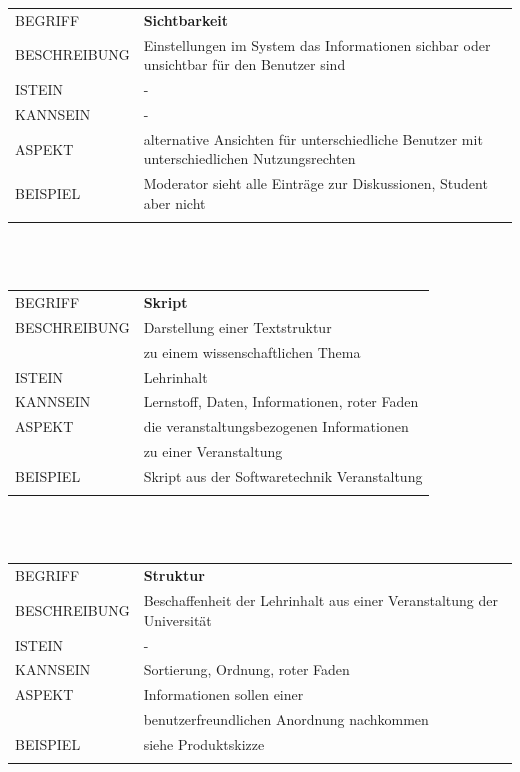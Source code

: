 \documentclass[12pt,a4paper]{article}
\begin{document}
\begin{tabular}{l p{12cm}}
BEGRIFF 	 & \textbf{Sichtbarkeit} \\ 
BESCHREIBUNG & Einstellungen im System das Informationen sichbar oder unsichtbar für den Benutzer sind\\ 
ISTEIN   	 & -\\
KANNSEIN 	 & -\\ 
ASPEKT   	 & alternative Ansichten für unterschiedliche Benutzer mit unterschiedlichen Nutzungsrechten \\
BEISPIEL 	 & Moderator sieht alle Einträge zur Diskussionen, Student aber nicht\\\\
\hline
\end{tabular}\\\\  


\begin{tabular}{l p{12cm}}
BEGRIFF 	 & \textbf{Skript} \\ 
BESCHREIBUNG & Darstellung einer Textstruktur\\
			 & zu einem wissenschaftlichen Thema\\ 
ISTEIN   	 & Lehrinhalt\\
KANNSEIN 	 & Lernstoff, Daten, Informationen, roter Faden\\ 
ASPEKT   	 & die veranstaltungsbezogenen Informationen\\
			 & zu einer Veranstaltung\\
BEISPIEL 	 & Skript aus der Softwaretechnik Veranstaltung\\\\
\hline
\end{tabular}\\\\  

\begin{tabular}{l p{12cm}}
BEGRIFF 	 & \textbf{Struktur} \\ 
BESCHREIBUNG & Beschaffenheit der Lehrinhalt aus einer Veranstaltung der 					   Universität\\ 
ISTEIN   	 & - \\
KANNSEIN 	 & Sortierung, Ordnung, roter Faden\\ 
ASPEKT   	 & Informationen sollen einer\\
			 & benutzerfreundlichen Anordnung nachkommen\\
BEISPIEL 	 & siehe Produktskizze\\\\
\hline
\end{tabular}\\\\ 
\end{document}

